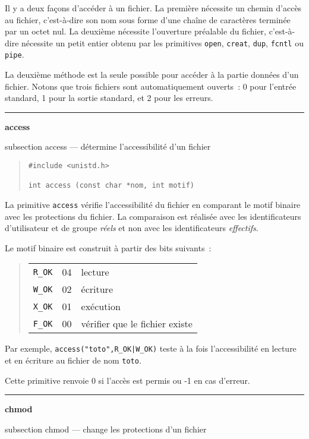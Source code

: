 \documentclass [twoside] {report}
\newcommand {\primitive} [1]
    {
	\phantomsection
	{\large \bf #1}
	\addcontentsline {toc} {subsection} {#1}
    }
\newcommand {\separation}
    {
	\vspace {5mm}
	\nopagebreak
	\hrule
    }
\begin{document}
Il y a deux façons d'accéder à un fichier. La première nécessite un
chemin d'accès au fichier, c'est-à-dire son nom sous forme d'une chaîne
de caractères terminée par un octet nul.  La deuxième nécessite
l'ouverture préalable du fichier, c'est-à-dire nécessite un petit
entier obtenu par les primitives {\tt open}, {\tt creat}, {\tt dup},
{\tt fcntl} ou {\tt pipe}.

La deuxième méthode est la seule possible pour
accéder à la partie données d'un fichier. Notons
que trois fichiers sont automatiquement ouverts~:
0 pour l'entrée standard, 1 pour la sortie
standard, et 2 pour les erreurs.





\separation
\primitive {access} --- détermine l'accessibilité d'un fichier

\begin {quote}
\begin {verbatim}
#include <unistd.h>

int access (const char *nom, int motif)
\end{verbatim}
\end {quote}

La primitive {\tt access} vérifie l'accessibilité
du fichier en comparant le motif binaire avec les
protections du fichier. La comparaison est
réalisée avec les identificateurs d'utilisateur et
de groupe {\it réels} et non avec les identificateurs
{\it effectifs}.

Le motif binaire est construit à partir des bits
suivants~:
\begin {quote}
    \begin {tabular} {|lll|} \hline
	\verb|R_OK| & 04 & lecture \\
	\verb|W_OK| & 02 & écriture \\
	\verb|X_OK| & 01 & exécution \\
	\verb|F_OK| & 00 & vérifier que le fichier existe \\ \hline
    \end {tabular}
\end {quote}

Par exemple, \verb/access("toto",R_OK|W_OK)/ teste à la fois
l'accessibilité en lecture et en écriture au fichier de nom {\tt toto}.

Cette primitive renvoie 0 si l'accès est permis
ou -1 en cas d'erreur.




\separation
\primitive {chmod} --- change les protections d'un fichier
\end{document}
